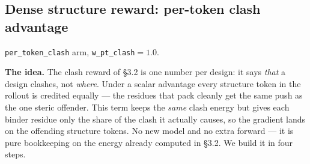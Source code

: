 \documentclass[11pt]{article}
\newcommand{\ttk}[1]{\texttt{\small #1}}
\begin{document}
\subsection{Dense structure reward: per-token clash advantage}
\ttk{per\_token\_clash} arm, \ttk{w\_pt\_clash}$=1.0$.

\textbf{The idea.} The clash reward of \S3.2 is one number per design: it says \emph{that} a design
clashes, not \emph{where}. Under a scalar advantage every structure token in the rollout is
credited equally --- the residues that pack cleanly get the same push as the one steric offender.
This term keeps the \emph{same} clash energy but gives each binder residue only the share of the
clash it actually causes, so the gradient lands on the offending structure tokens. No new model and
no extra forward --- it is pure bookkeeping on the energy already computed in \S3.2. We build it in
four steps.
\end{document}
